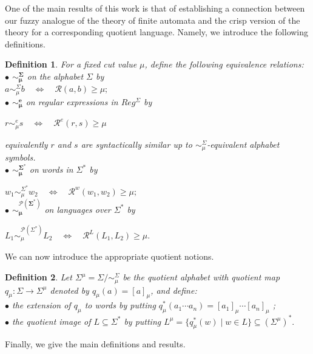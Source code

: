 \documentclass{easychair}
\newtheorem{definition}{Definition}
\begin{document}
One of the main results of this work is that of establishing a connection between our fuzzy analogue of the theory of finite automata and the crisp version of the theory for a corresponding quotient language. Namely, we introduce the following definitions.
\begin{definition}For a fixed cut value $\mu$, define the following equivalence relations: \\
$\bullet$ $\boldsymbol{\sim_\mu^\Sigma}$ on the alphabet $\Sigma$ by\\ 

$a\sim_\mu^\Sigma b
\quad\Longleftrightarrow\quad
\mathcal R(a,b)\ge\mu;
$
\\
$\bullet$ $\boldsymbol{\sim_\mu^e}$ on regular expressions in $Reg^\Sigma$ by

$r\sim_\mu^e s
\quad\Longleftrightarrow\quad
\mathcal R^e(r,s)\ge\mu$

equivalently $r$ and $s$ are syntactically similar up to $\sim_\mu^\Sigma$-equivalent alphabet symbols.
\\
$\bullet$ $\boldsymbol{\sim_\mu^{\Sigma^\ast}}$ on words in $\Sigma^\ast$ by
 
$w_1\sim_\mu^{\Sigma^\ast} w_2
\quad\Longleftrightarrow\quad
\mathcal R^w(w_1,w_2)\ge\mu;
$\\
$\bullet$ $\boldsymbol{\sim_\mu^{\mathcal P(\Sigma^\ast)}}$ on languages over $\Sigma^\ast$ by

$L_1\sim_\mu^{\mathcal P(\Sigma^\ast)} L_2
\quad\Longleftrightarrow\quad
\mathcal R^L(L_1,L_2)\ge\mu.
$
\end{definition}
We can now introduce the appropriate quotient notions.
\begin{definition}Let
$\Sigma^\mu=\Sigma/{\sim_\mu^\Sigma}$
be the {\em quotient alphabet} with quotient map
$q_\mu:\Sigma\to\Sigma^\mu$ denoted by $q_\mu(a)=[a]_\mu$, and define:\\
$\bullet$ the extension of $q_\mu$ to words by putting $
q_\mu^\ast(a_1\cdots a_n)
=
[a_1]_\mu\cdots[a_n]_\mu
$ ; \\
$\bullet$ the quotient image of $L\subseteq\Sigma^\ast$ by putting
$ L^\mu=%
\{q_\mu^\ast(w)\mid w\in L\}
\subseteq(\Sigma^\mu)^\ast.
$ 
\end{definition}
Finally, we give the main definitions and results.
\end{document}
